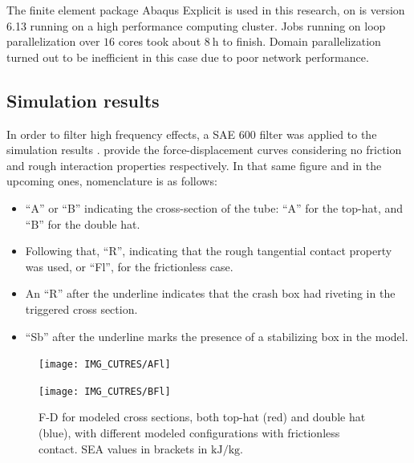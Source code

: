 \documentclass[cmfonts]{witpress}
\begin{document}
The finite element package Abaqus Explicit is used in this research, on is version 6.13 \cite{Abaqus613Manual} running on a high performance computing cluster. Jobs running on loop parallelization over $16$ cores took about $\SI{8}{\hour}$ to finish. Domain parallelization turned out to be inefficient in this case due to poor network performance.

\subsection{Simulation results}


In order to filter high frequency effects, a SAE 600 filter was applied to the simulation results \cite{Huang}.  provide the force-displacement curves considering no friction and rough interaction properties respectively. In that same figure and in the upcoming ones, nomenclature is as follows:
\begin{itemize}
	\item ``A'' or ``B'' indicating the cross-section of the tube: ``A'' for the top-hat, and ``B'' for the double hat.

	\item Following that, ``R'', indicating that the rough tangential contact property was used, or ``Fl'', for the frictionless case.

	\item An ``R'' after the underline indicates that the crash box had riveting in the triggered cross section.

	\item ``Sb'' after the underline marks the presence of a stabilizing box in the model.
\end{itemize}

\begin{figure}
	\centering
	\begin{minipage}[b]{.9\linewidth}
		\centering
		\texttt{[image: IMG\_CUTRES/AFl]}
	\end{minipage}
	\quad
	\begin{minipage}[b]{.9\linewidth}
		\centering
		\texttt{[image: IMG\_CUTRES/BFl]}
	\end{minipage}
	\caption[F-D for modeled cross sections, both top-hat and double hat, with different modeled configurations with frictionless contact.]{F-D for modeled cross sections, both top-hat (red) and double hat (blue), with different modeled configurations with frictionless contact. SEA values in brackets in $\si{\kJ/\kg}$.}
	\label{fig:F-D_frictionless}
\end{figure}
\end{document}

